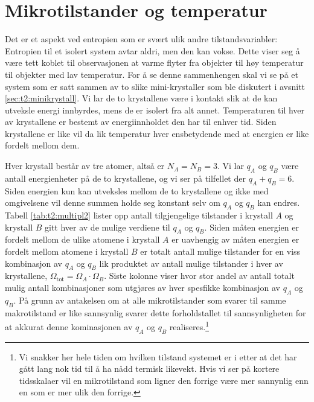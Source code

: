 \section{Mikrotilstander og temperatur}
Det er et aspekt ved entropien som er svært ulik andre tilstandsvariabler: Entropien til et isolert system avtar aldri, men den kan vokse. Dette viser seg å være tett koblet til observasjonen at varme flyter fra objekter til høy temperatur til objekter med lav temperatur. For å se denne sammenhengen skal vi se på et system som er satt sammen av to slike mini-krystaller som ble diskutert i avsnitt \ref{sec:t2:minikrystall}. Vi lar de to krystallene være i kontakt slik at de kan utveksle energi innbyrdes, mens de er isolert fra alt annet. Temperaturen til hver av krystallene er bestemt av energiinnholdet den har til enhver tid. Siden krystallene er like vil da lik temperatur hver ensbetydende med at energien er like fordelt mellom dem.

Hver krystall består av tre atomer, altså er $N_A = N_B = 3$. Vi lar $q_A$ og $q_B$ være antall energienheter på de to krystallene, og vi ser på tilfellet der $q_A + q_B = 6$. Siden energien kun kan utveksles mellom de to krystallene og ikke med omgivelsene vil denne summen holde seg konstant selv om $q_A$ og $q_B$ kan endres. Tabell \ref{tab:t2:multipl2} lister opp antall tilgjengelige tilstander i krystall $A$ og krystall $B$ gitt hver av de mulige verdiene til $q_A$ og $q_B$. Siden måten energien er fordelt mellom de ulike atomene i krystall $A$ er uavhengig av måten energien er fordelt mellom atomene i krystall $B$ er totalt antall mulige tilstander for en viss kombinasjon av $q_A$ og $q_B$ lik produktet av antall mulige tilstander i hver av krystallene, $\Omega_\text{tot} = \Omega_A\cdot\Omega_B$. Siste kolonne viser hvor stor andel av antall totalt mulig antall kombinasjoner som utgjøres av hver spesfikke kombinasjon av  $q_A$ og $q_B$. På grunn av antakelsen om at alle mikrotilstander som svarer til samme makrotilstand er like sannsynlig svarer dette forholdstallet til sannsynligheten for at akkurat denne kominasjonen av $q_A$ og $q_B$ realiseres.\footnote{Vi snakker her hele tiden om hvilken tilstand systemet er i etter at det har gått lang nok tid til å ha nådd termisk likevekt. Hvis vi ser på kortere tidsskalaer vil en mikrotilstand som ligner den forrige være mer sannynlig enn en som er mer ulik den forrige.}

